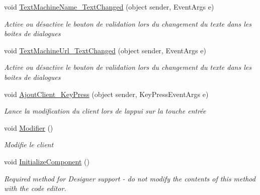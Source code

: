 \begin{DoxyCompactItemize}
void \mbox{\hyperlink{class_m_t_connect_agent_1_1_form_modifie_machine_aca9125dc1faa86b2a5ba56a9192a09fe}{Text\+Machine\+Name\+\_\+\+Text\+Changed}} (object sender, Event\+Args e)
\begin{DoxyCompactList}\small\item\em Active ou désactive le bouton de validation lors du changement du texte dans les boites de dialogues \end{DoxyCompactList}\item 
void \mbox{\hyperlink{class_m_t_connect_agent_1_1_form_modifie_machine_abd92a2fdb113e3d7a51dc156ad4aefb4}{Text\+Machine\+Url\+\_\+\+Text\+Changed}} (object sender, Event\+Args e)
\begin{DoxyCompactList}\small\item\em Active ou désactive le bouton de validation lors du changement du texte dans les boites de dialogues \end{DoxyCompactList}\item 
void \mbox{\hyperlink{class_m_t_connect_agent_1_1_form_modifie_machine_a584ddf767c5e0c8d114f4127022b33cb}{Ajout\+Client\+\_\+\+Key\+Press}} (object sender, Key\+Press\+Event\+Args e)
\begin{DoxyCompactList}\small\item\em Lance la modification du client lors de l\textquotesingle{}appui sur la touche entrée \end{DoxyCompactList}\item 
void \mbox{\hyperlink{class_m_t_connect_agent_1_1_form_modifie_machine_af65b4b64655a0e36a36bb0e439e8f8f0}{Modifier}} ()
\begin{DoxyCompactList}\small\item\em Modifie le client \end{DoxyCompactList}\item 
void \mbox{\hyperlink{class_m_t_connect_agent_1_1_form_modifie_machine_aa8266f231d02b13a7090ac5cfe2e9600}{Initialize\+Component}} ()
\begin{DoxyCompactList}\small\item\em Required method for Designer support -\/ do not modify the contents of this method with the code editor. \end{DoxyCompactList}\end{DoxyCompactItemize}
